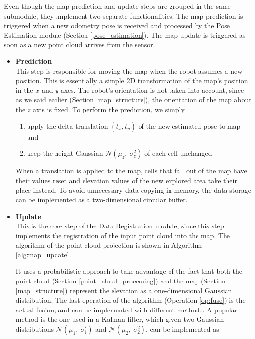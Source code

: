 Even though the map prediction and update steps are grouped in the
same submodule, they implement two separate functionalities.
The map prediction is triggered when a new odometry pose is received and
processed by the Pose Estimation module (Section \ref{pose_estimation}).
The map update is triggered as soon as a new point cloud arrives from
the sensor.
\begin{itemize}
    \item \textbf{Prediction} \\
        This step is responsible for moving the map when the robot assumes
        a new position.
        This is essentially a simple 2D transformation of the map's position
        in the $x$ and $y$ axes.
        The robot's orientation is not taken into account, since as we said
        earlier (Section \ref{map_structure}), the orientation of the map
        about the $z$ axis is fixed.
        To perform the prediction, we simply

        \begin{enumerate}
            \item apply the delta translation $(t_x,t_y)$ of the
                new estimated pose to map and
            \item keep the height Gaussian $\mathcal{N}(\mu_z, \ \sigma^2_z)$
                of each cell unchanged
        \end{enumerate}

        When a translation is applied to the map, cells that fall out of the
        map have their values reset and elevation values of the new explored
        area take their place instead.
        To avoid unnecessary data copying in memory, the data storage can be
        implemented as a two-dimensional circular buffer.

    \item \label{map_update} \textbf{Update} \\
        This is the core step of the Data Registration module, since this
        step implements the registration of the input point cloud into the map.
        The algorithm of the point cloud projection is shown in Algorithm
        \ref{alg:map_update}.

        It uses a probabilistic approach to take advantage of the
        fact that both the point cloud (Section \ref{point_cloud_processing})
        and the map (Section \ref{map_structure}) represent the elevation
        as a one-dimensional Gaussian distribution.
        The last operation of the algorithm (Operation \ref{op:fuse}) is the
        actual fusion, and can be implemented with different methods.
        A popular method is the one used in a Kalman filter, which given
        two Gaussian distributions $\mathcal{N}(\mu_1, \ \sigma^2_1)$ and
        $\mathcal{N}(\mu_2, \ \sigma^2_2)$, can be implemented as


\end{itemize}
